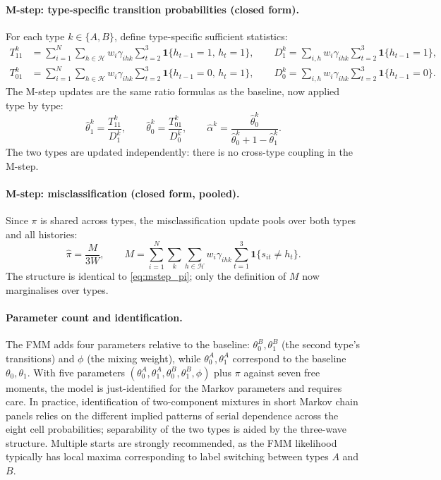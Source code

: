 \paragraph{M-step: type-specific transition probabilities (closed form).}
For each type \(k \in \{A, B\}\), define type-specific sufficient
statistics:
\begin{align}
T_{11}^k &= \sum_{i=1}^{N} \sum_{h \in \mathcal{H}} w_i \gamma_{ihk}
  \sum_{t=2}^{3} \mathbf{1}\{h_{t-1} = 1,\, h_t = 1\}, \qquad
D_1^k = \sum_{i,h} w_i \gamma_{ihk}
  \sum_{t=2}^{3} \mathbf{1}\{h_{t-1} = 1\},
\label{eq:suff_T_fmm} \\
T_{01}^k &= \sum_{i=1}^{N} \sum_{h \in \mathcal{H}} w_i \gamma_{ihk}
  \sum_{t=2}^{3} \mathbf{1}\{h_{t-1} = 0,\, h_t = 1\}, \qquad
D_0^k = \sum_{i,h} w_i \gamma_{ihk}
  \sum_{t=2}^{3} \mathbf{1}\{h_{t-1} = 0\}.
\label{eq:suff_T01_fmm}
\end{align}
The M-step updates are the same ratio formulas as the baseline, now
applied type by type:
\begin{equation}
\hat{\theta}_1^k = \frac{T_{11}^k}{D_1^k}, \qquad
\hat{\theta}_0^k = \frac{T_{01}^k}{D_0^k}, \qquad
\hat{\alpha}^k = \frac{\hat{\theta}_0^k}{\hat{\theta}_0^k + 1 - \hat{\theta}_1^k}.
\label{eq:mstep_theta_fmm}
\end{equation}
The two types are updated independently: there is no cross-type coupling
in the M-step.

\paragraph{M-step: misclassification (closed form, pooled).}
Since \(\pi\) is shared across types, the misclassification update pools
over both types and all histories:
\begin{equation}
\hat{\pi} = \frac{M}{3W}, \qquad
M = \sum_{i=1}^{N} \sum_{k} \sum_{h \in \mathcal{H}}
  w_i \gamma_{ihk}
  \sum_{t=1}^{3} \mathbf{1}\{s_{it} \neq h_t\}.
\label{eq:mstep_pi_fmm}
\end{equation}
The structure is identical to \eqref{eq:mstep_pi}; only the definition
of \(M\) now marginalises over types.

\paragraph{Parameter count and identification.}
The FMM adds four parameters relative to the baseline:
\(\theta_0^B, \theta_1^B\) (the second type's transitions) and
\(\phi\) (the mixing weight), while \(\theta_0^A, \theta_1^A\)
correspond to the baseline \(\theta_0, \theta_1\). With five
parameters \((\theta_0^A, \theta_1^A, \theta_0^B, \theta_1^B, \phi)\)
plus \(\pi\) against seven free moments, the model is just-identified
for the Markov parameters and requires care. In practice, identification
of two-component mixtures in short Markov chain panels relies on the
different implied patterns of serial dependence across the eight cell
probabilities; separability of the two types is aided by the three-wave
structure. Multiple starts are strongly recommended, as the FMM
likelihood typically has local maxima corresponding to label switching
between types \(A\) and \(B\).

